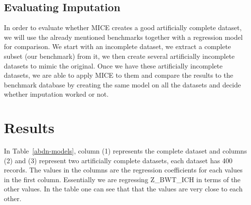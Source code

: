 \documentclass[a0,portrait]{a0poster}
\begin{document}
\begin{multicols}{2}
\subsection*{Evaluating Imputation} 
In order to evaluate whether MICE creates a good artificially complete dataset, we will use the already mentioned benchmarks together with a regression model for comparison. We start with an incomplete dataset, we extract a complete subset (our benchmark) from it, we then create several artificially incomplete datasets to mimic the original. Once we have these artificially incomplete datasets, we are able to apply MICE to them and compare the results to the benchmark database by creating the same model on all the datasets and decide whether imputation worked or not.




\section*{Results}

In Table~\ref{abdn-models}, column (1) represents the complete dataset and columns (2) and (3) represent two artificially complete datasets, each dataset has 400 records. The values in the columns are the regression coefficients for each values in the first column. Essentially we are regressing Z\_BWT\_ICH in terms of the other values. In the table one can see that that the values are very close to each other.



\end{multicols}
\end{document}
